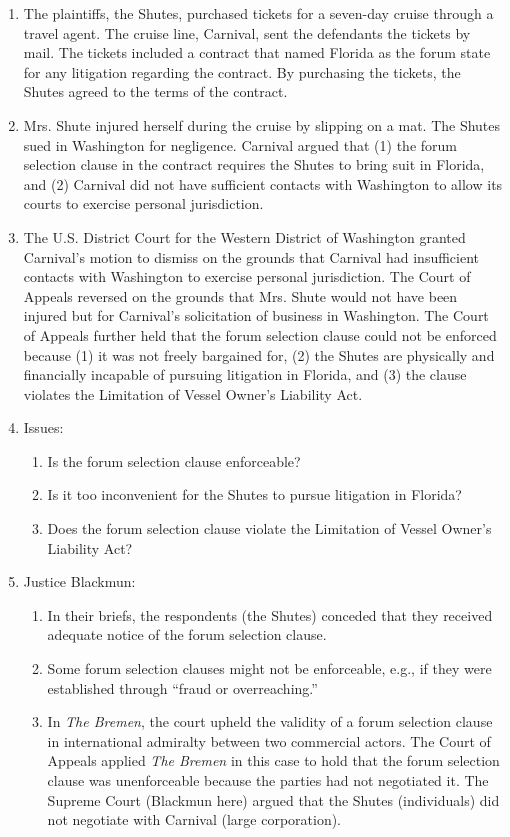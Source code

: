 \begin{enumerate}
    \item The plaintiffs, the Shutes, purchased tickets for a seven-day cruise through a travel agent. The cruise line, Carnival, sent the defendants the tickets by mail. The tickets included a contract that named Florida as the forum state for any litigation regarding the contract. By purchasing the tickets, the Shutes agreed to the terms of the contract.
    \item Mrs. Shute injured herself during the cruise by slipping on a mat. The Shutes sued in Washington for negligence. Carnival argued that (1) the forum selection clause in the contract requires the Shutes to bring suit in Florida, and (2) Carnival did not have sufficient contacts with Washington to allow its courts to exercise personal jurisdiction.
    \item The U.S. District Court for the Western District of Washington granted Carnival's motion to dismiss on the grounds that Carnival had insufficient contacts with Washington to exercise personal jurisdiction. The Court of Appeals reversed on the grounds that Mrs. Shute would not have been injured but for Carnival's solicitation of business in Washington. The Court of Appeals further held that the forum selection clause could not be enforced because (1) it was not freely bargained for, (2) the Shutes are physically and financially incapable of pursuing litigation in Florida, and (3) the clause violates the Limitation of Vessel Owner's Liability Act.
    \item Issues:
    \begin{enumerate}
        \item Is the forum selection clause enforceable?
        \item Is it too inconvenient for the Shutes to pursue litigation in Florida?
        \item Does the forum selection clause violate the Limitation of Vessel Owner's Liability Act?
    \end{enumerate}
    \item Justice Blackmun:
    \begin{enumerate}
        \item In their briefs, the respondents (the Shutes) conceded that they received adequate notice of the forum selection clause.
        \item Some forum selection clauses might not be enforceable, e.g., if they were established through ``fraud or overreaching.''
        \item In \emph{The Bremen}, the court upheld the validity of a forum selection clause in international admiralty between two commercial actors. The Court of Appeals applied \emph{The Bremen} in this case to hold that the forum selection clause was unenforceable because the parties had not negotiated it. The Supreme Court (Blackmun here) argued that the Shutes (individuals) did not negotiate with Carnival (large corporation).

\end{enumerate}
\end{enumerate}
